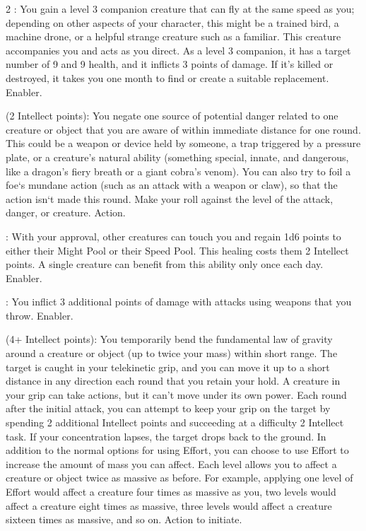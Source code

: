 \begin{multicols}{2}
: You gain a level 3 companion creature that can fly at the same speed as you; depending on other aspects of your character, this might be a trained bird, a machine drone, or a helpful strange creature such as a familiar. This creature accompanies you and acts as you direct. As a level 3 companion, it has a target number of 9 and 9 health, and it inflicts 3 points of damage. If it’s killed or destroyed, it takes you one month to find or create a suitable replacement. Enabler.

 (2 Intellect points): You negate one source of potential danger related to one creature or object that you are aware of within immediate distance for one round. This could be a weapon or device held by someone, a trap triggered by a pressure plate, or a creature’s natural ability (something special, innate, and dangerous, like a dragon’s fiery breath or a giant cobra’s venom). You can also try to foil a foe‘s mundane action (such as an attack with a weapon or claw), so that the action isn‘t made this round. Make your roll against the level of the attack, danger, or creature. Action. 
 
: With your approval, other creatures can touch you and regain 1d6 points to either their Might Pool or their Speed Pool. This healing costs them 2 Intellect points. A single creature can benefit from this ability only once each day. Enabler. 
 
: You inflict 3 additional points of damage with attacks using weapons that you throw. Enabler. 
 
 (4+ Intellect points): You temporarily bend the fundamental law of gravity around a creature or object (up to twice your mass) within short range. The target is caught in your telekinetic grip, and you can move it up to a short distance in any direction each round that you retain your hold. A creature in your grip can take actions, but it can’t move under its own power. Each round after the initial attack, you can attempt to keep your grip on the target by spending 2 additional Intellect points and succeeding at a difficulty 2 Intellect task. If your concentration lapses, the target drops back to the ground. In addition to the normal options for using Effort, you can choose to use Effort to increase the amount of mass you can affect. Each level allows you to affect a creature or object twice as massive as before. For example, applying one level of Effort would affect a creature four times as massive as you, two levels would affect a creature eight times as massive, three levels would affect a creature sixteen times as massive, and so on. Action to initiate. 
 

\end{multicols}
